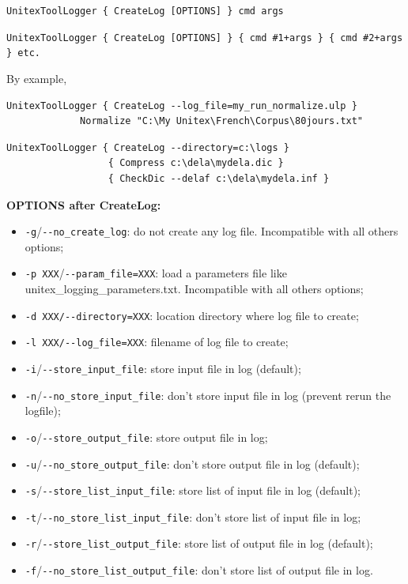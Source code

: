 \bigskip
\noindent \verb$UnitexToolLogger { CreateLog [OPTIONS] } cmd args$

\bigskip
\noindent \verb$UnitexToolLogger { CreateLog [OPTIONS] } { cmd #1+args } { cmd #2+args } etc.$

By example,
\bigskip
\begin{verbatim}
UnitexToolLogger { CreateLog --log_file=my_run_normalize.ulp }
             Normalize "C:\My Unitex\French\Corpus\80jours.txt"
\end{verbatim}

\bigskip
\begin{verbatim}
UnitexToolLogger { CreateLog --directory=c:\logs }
                  { Compress c:\dela\mydela.dic }
                  { CheckDic --delaf c:\dela\mydela.inf }
\end{verbatim}

\bigskip
\noindent \textbf{OPTIONS after CreateLog:}
\begin{itemize}
  \item \verb+-g+/\verb+--no_create_log+: do not create any log file. Incompatible with all others options;

  \item \verb+-p XXX+/\verb+--param_file=XXX+: load a parameters file like unitex\_logging\_parameters.txt. Incompatible with all others options;

  \item \verb+-d XXX/--directory=XXX+: location directory where log file to create;
  \item \verb+-l XXX/--log_file=XXX+: filename of log file to create;
  \item \verb+-i+/\verb+--store_input_file+: store input file in log (default);
  \item \verb+-n+/\verb+--no_store_input_file+: don't store input file in log (prevent rerun the logfile);
  \item \verb+-o+/\verb+--store_output_file+: store output file in log;
  \item \verb+-u+/\verb+--no_store_output_file+: don't store output file in log (default);
  \item \verb+-s+/\verb+--store_list_input_file+: store list of input file in log (default);
  \item \verb+-t+/\verb+--no_store_list_input_file+: don't store list of input file in log;
  \item \verb+-r+/\verb+--store_list_output_file+: store list of output file in log (default);
  \item \verb+-f+/\verb+--no_store_list_output_file+: don't store list of output file in log.
\end{itemize}



